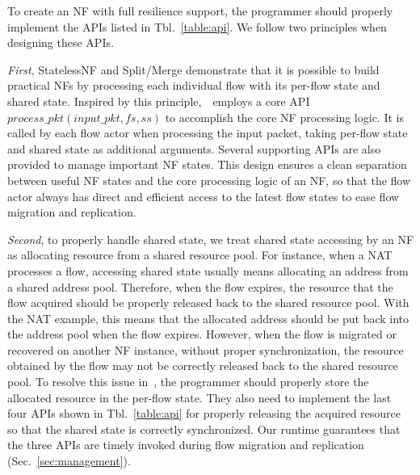 To create an NF with full resilience support, the programmer should properly implement the APIs listed in Tbl.~\ref{table:api}. We follow two principles when designing these APIs.

{\em First}, StatelessNF \cite{201545} and Split/Merge \cite{rajagopalan2013split} demonstrate that it is possible to build practical NFs by processing each individual flow with its per-flow state and shared state. Inspired by this principle,~\nfactor~employs a core API $process\_pkt(input\_pkt, fs, ss)$ to accomplish the core NF processing logic. It is called by each flow actor when processing the input packet, taking per-flow state and shared state as additional arguments. Several supporting APIs are also provided to manage important NF states. This design %
 ensures a clean separation between useful NF states and the core processing logic of an NF, so that the flow actor always has direct and efficient access to the latest flow states to ease flow migration and replication.

{\em Second}, to properly handle shared state, we treat shared state accessing by an NF as allocating resource from a shared resource pool. For instance, when a NAT processes a flow, accessing shared state usually means allocating an address from a shared address pool. Therefore, when the flow expires, the resource that the flow acquired should be properly released back to the shared resource pool. With the NAT example, this means that the allocated address should be put back into the address pool when the flow expires. However, when the flow is migrated or recovered on another NF instance, without proper synchronization, the resource obtained by the flow may not be correctly released back to the shared resource pool. To resolve this issue in~\nfactor, the programmer should properly store the allocated resource in the per-flow state. They also need to implement the last four APIs shown in Tbl.~\ref{table:api} for properly releasing the acquired resource so that the shared state is correctly synchronized. Our runtime guarantees that the three APIs are timely invoked during flow migration and replication (Sec.~\ref{sec:management}).



